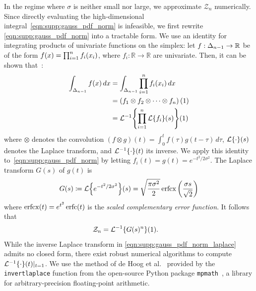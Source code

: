 In the regime where $\sigma$ is neither small nor large, we approximate $\mathcal{Z}_n$ numerically.
Since directly evaluating the high-dimensional integral~\eqref{eqn:supp:gauss_pdf_norm} is infeasible, we first rewrite \cref{eqn:supp:gauss_pdf_norm} into a tractable form.
We use an identity for integrating products of univariate functions on the simplex: let $f : \Delta_{n-1} \to \mathbb{R}$ be of the form $f(x) = \prod_{i=1}^{n} f_i(x_i)$, where $f_i : \mathbb{R} \to \mathbb{R}$ are univariate.
Then, it can be shown that~\citep{wolpert_estimating_1995}:
\begin{align}
    \int_{\ProbSimplex{n-1}} f(\vv{x}) \, d\vv{x} & = \int_{\ProbSimplex{n-1}} \prod_{i=1}^n f_i (\vv{x}_i) \, d\vv{x} \\
                                                  & = \left( f_1 \otimes f_2 \otimes \cdots \otimes f_n \right)(1)     \\
                                                  & = \InvLaplace{ \prod_{i=1}^n \Laplace{ f_i }(s) }(1)
\end{align}
where $\otimes$ denotes the convolution $(f \otimes g)(t) = \int_0^t f(\tau) g(t - \tau) \, d\tau$, $\Laplace{\cdot}(s)$ denotes the Laplace transform, and $\InvLaplace{\cdot}(t)$ its inverse.
We apply this identity to~\eqref{eqn:supp:gauss_pdf_norm} by letting $f_i(t) = g(t) = e^{-t^2 / 2\sigma^2}$.
The Laplace transform $G(s)$ of $g(t)$ is
\begin{align}
    G(s) \coloneqq \Laplace{ e^{-t^2 / 2\sigma^2} }(s) = \sqrt{\frac{\pi \sigma^2}{2}} \erfcx\left(\frac{\sigma s}{\sqrt{2}}\right)
\end{align}
where $\operatorname{erfcx}(t) = e^{t^2} \operatorname{erfc}(t)$ is the \textit{scaled complementary error function}.
It follows that
\begin{align}\label{eqn:supp:gauss_pdf_norm_laplace}
    \begin{split}
        \mathcal{Z}_n & = \InvLaplace{ G(s)^n }(1).
    \end{split}
\end{align}
While the inverse Laplace transform in \eqref{eqn:supp:gauss_pdf_norm_laplace} admits no closed form, there exist robust numerical algorithms to compute $\InvLaplace{\cdot}(t)|_{t=1}$.
We use the method of de Hoog et al.~\citep{de_hoog_improved_1982} provided by the \texttt{invertlaplace} function from the open-source Python package \texttt{mpmath}~\citep{johansson_mpmath_2021}, a library for arbitrary-precision floating-point arithmetic.

